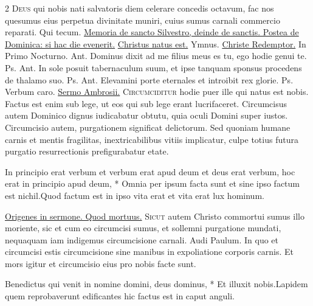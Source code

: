 \begin{multicols*}{2}
\lettrine[lines=2]{\zallmancaps \color{Blue} D}{eus} \hypertarget{deus-nobis-circumcisionis}{qui} nobis nati salvatoris diem celerare concedis octavum, fac nos quesumus eius perpetua divinitate muniri, cuius sumus carnali commercio reparati. Qui tecum. \ul{Memoria de sancto Silvestro, deinde de sanctis. Postea de Dominica: si hac die evenerit.}
 \hyperlink{christus-natus-invitatorium}{Christus natus est.} {\color{Red} Ymnus.} \hyperlink{christe-redemptor}{Christe Redemptor.} {\color{Red} In Primo Nocturno. Ant.} \hypertarget{ant-dominus-dixit}{Dominus} dixit ad me filius meus es tu, ego hodie genui te. {\color{Red} Ps.}  {\color{Red} Ant.} In sole posuit tabernaculum suum, et ipse tanquam sponsus procedens de thalamo suo. {\color{Red} Ps.}  {\color{Red} Ant.} Elevamini porte eternales et introibit rex glorie. {\color{Red} Ps.}  \V Verbum caro.
 \ul{Sermo Ambrosii.} {\color{Red} \grecross}
\lettrine[lines=2]{\zallmancaps \color{Red} C}{ircumciditur} hodie puer ille qui natus est nobis. Factus est enim sub lege, ut eos qui sub lege erant lucrifaceret.
Circumcisus autem Dominico dignus iudicabatur obtutu, %
quia oculi Domini super iustos. Circumcisio autem, purgationem significat delictorum. Sed quoniam humane carnis et mentis fragilitas, inextricabilibus vitiis implicatur, culpe totius futura purgatio resurrectionis prefigurabatur etate.
\begin{responsory}
{In principio erat verbum et verbum erat apud deum et deus erat verbum, hoc erat in principio apud deum, * Omnia per ipsum facta sunt et sine ipso factum est nichil.}{Quod factum est in ipso vita erat et vita erat lux hominum.}
\end{responsory}%
 \ul{Origenes in sermone. Quod mortuus.} {\color{Red} \grecross}
\lettrine[lines=2]{\zallmancaps \color{Blue} S}{icut} autem Christo commortui sumus illo moriente, sic et cum eo circumcisi sumus, et sollemni purgatione mundati, nequaquam iam indigemus circumcisione carnali. Audi Paulum. %
In quo et circumcisi estis circumcisione sine manibus in expoliatione corporis carnis. Et mors igitur et circumcisio eius pro nobis facte sunt.
\begin{responsory}
{Benedictus qui venit in nomine domini, deus dominus, * Et illuxit nobis.}{Lapidem quem reprobaverunt edificantes hic factus est in caput anguli.}

\end{responsory}
\end{multicols*}
